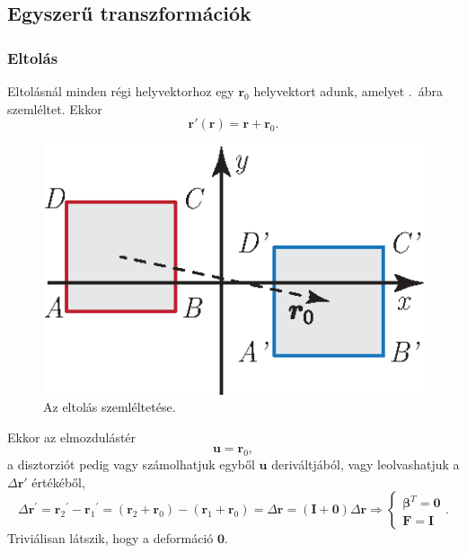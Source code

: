 \documentclass[12pt,a4paper]{scrartcl}
\let\mathbf\bm
\begin{document}
\subsection{Egyszerű transzformációk}
\subsubsection{Eltolás}
Eltolásnál minden régi helyvektorhoz egy ${{\mathbf{r}}_0}$ helyvektort adunk, amelyet \az{\ref{fig:eltolas}}.\ ábra szemléltet. Ekkor
\[{\mathbf{r}}'\left( {\mathbf{r}} \right) = {\mathbf{r}} + {{\mathbf{r}}_0}.\]
\begin{figure}[htb] 
\centering    
\includegraphics[scale=1]{figs/eltolas.eps}
\caption{Az eltolás szemléltetése.}
\label{fig:eltolas}
\end{figure}
Ekkor az elmozdulástér
\[{\mathbf{u}} = {{\mathbf{r}}_0},\]
a disztorziót pedig vagy számolhatjuk egyből ${\mathbf{u}}$ deriváltjából, vagy leolvashatjuk a $\Delta {\mathbf{r}}'$ értékéből,
\[\Delta {{\mathbf{r}}^\prime } = {{\mathbf{r}}_2}^\prime  - {{\mathbf{r}}_1}^\prime  = \left( {{{\mathbf{r}}_2} + {{\mathbf{r}}_0}} \right) - \left( {{{\mathbf{r}}_1} + {{\mathbf{r}}_0}} \right) = \Delta {\mathbf{r}} = \left( {{\mathbf{I}} + {\mathbf{0}}} \right)\Delta {\mathbf{r}} \Rightarrow \left\{ {\begin{array}{*{20}{c}}
  {{{\mathbf{\beta }}^T} = {\mathbf{0}}} \\ 
  {{\mathbf{F}} = {\mathbf{I}}} 
\end{array}} \right..\]
Triviálisan látszik, hogy a deformáció ${\mathbf{0}}$.
\end{document}
